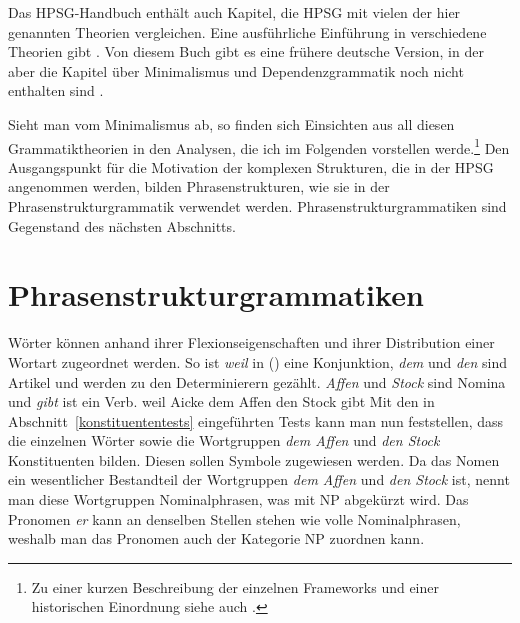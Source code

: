 \noindent
Das HPSG-Handbuch \citep{HPSGHandbook} enthält auch Kapitel, die HPSG mit vielen der hier genannten
Theorien vergleichen. Eine ausführliche Einführung in verschiedene Theorien gibt
\citet{MuellerGT-Eng}. Von diesem Buch gibt es eine frühere deutsche Version, in der aber die Kapitel
über Minimalismus und Dependenzgrammatik noch nicht enthalten sind \citep{MuellerGTBuch}.

Sieht man vom Minimalismus ab, so finden sich Einsichten aus all diesen Grammatiktheorien
in den Analysen, die ich im Folgenden vorstellen werde.\footnote{
  Zu einer kurzen Beschreibung der einzelnen Frameworks und einer historischen Einordnung
  siehe auch .%
}
Den Ausgangspunkt für die Motivation
der komplexen Strukturen, die in der HPSG angenommen werden, bilden Phrasenstrukturen, wie sie
in der Phrasenstrukturgrammatik verwendet werden. Phrasenstrukturgrammatiken sind Gegenstand des
nächsten Abschnitts.


\section{Phrasenstrukturgrammatiken}
\label{sec-psg}

Wörter können anhand ihrer Flexionseigenschaften und ihrer Distribution einer Wortart zugeordnet werden.
So ist \emph{weil} in () eine Konjunktion, \emph{dem} und \emph {den}
sind Artikel und werden zu den Determinierern gezählt. \emph{Affen} und \emph{Stock} sind Nomina und \emph{gibt}
ist ein Verb.
\ea
\label{bsp-weil-Aicke-dem-Affen-den-Stock-gibt}
weil Aicke dem Affen den Stock gibt
\z
Mit den in Abschnitt~\ref{konstituententests} eingeführten Tests kann man nun feststellen, dass
die einzelnen Wörter sowie die Wortgruppen \emph{dem Affen} und \emph{den Stock} Konstituenten bilden.
Diesen sollen Symbole zugewiesen werden. Da das Nomen ein wesentlicher Bestandteil der Wortgruppen
\emph{dem Affen} und \emph{den Stock} ist, nennt man diese Wortgruppen Nominalphrasen, was mit NP abgekürzt wird. Das Pronomen \emph{er}
kann an denselben Stellen stehen wie volle Nominalphrasen, weshalb man das Pronomen auch der
Kategorie NP zuordnen kann.

